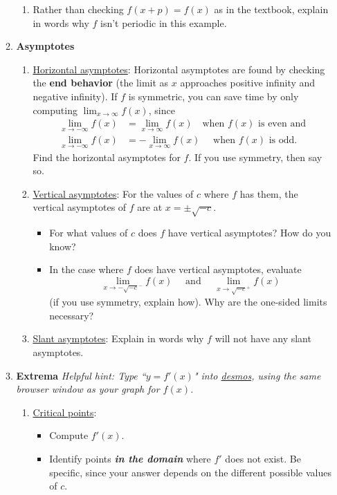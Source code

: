 \documentclass[%
]{article}
\begin{document}
\begin{enumerate}
\begin{enumerate}
\begin{enumerate}
		\item Rather than checking $f(x+p)=f(x)$ as in the textbook, explain in words why $f$ isn't periodic in this example.
		\end{enumerate}
	\item \textbf{Asymptotes} \begin{enumerate}
		\item \underline{Horizontal asymptotes}:  Horizontal asymptotes are found by checking the \textbf{end behavior} (the limit as $x$ approaches positive infinity and negative infinity).  If $f$ is symmetric, you can save time by only computing $\lim_{x\to\infty}f(x)$, since 
		\begin{align*}
		\lim_{x\to-\infty}f(x) &= \lim_{x\to\infty}f(x)\quad\text{when $f(x)$ is even and} \\
		\lim_{x\to-\infty}f(x) &= -\lim_{x\to\infty}f(x)\quad\text{ when $f(x)$ is odd.}
		\end{align*}  
		Find the horizontal asymptotes for $f$.  If you use symmetry, then say so.
		\item \underline{Vertical asymptotes}: For the values of $c$ where $f$ has them, the vertical asymptotes of $f$ are at $x=\pm\sqrt{-c}$.  
			\begin{itemize}
			\item For what values of $c$ does $f$ have vertical asymptotes?  How do you know?
			\item In the case where $f$ does have vertical asymptotes, evaluate
			\[
			\lim_{x\to -\sqrt{-c}^-}f(x) \quad\text{ and }\quad \lim_{x\to \sqrt{-c}^+}f(x)
			\]
			(if you use symmetry, explain how).  Why are the one-sided limits necessary?
			\end{itemize}
		\item \underline{Slant asymptotes}: Explain in words why $f$ will not have any slant asymptotes.	
		\end{enumerate}	
	\item \textbf{Extrema}	\textit{Helpful hint: Type ``$y=f'(x)$" into \url{desmos}, using the same browser window as your graph for $f(x)$.} 
		\begin{enumerate}
		\item \underline{Critical points}:
			\begin{itemize}
			\item Compute $f'(x)$.
			\item Identify points \textbf{\textit{in the domain}} where $f'$ does not exist.  Be specific, since your answer depends on the different possible values of $c$.  

\end{itemize}
\end{enumerate}
\end{enumerate}
\end{enumerate}
\end{document}
